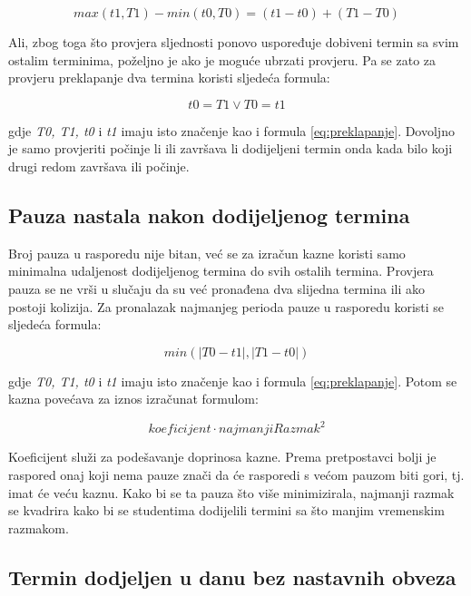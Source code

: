 \documentclass[times, utf8, zavrsni]{fer}
\begin{document}
\begin{equation}
max(t1, T1) - min(t0, T0) = (t1 - t0) + (T1  - T0)
\label{eq:slijednost-long}
\end{equation}

Ali, zbog toga što provjera sljednosti ponovo uspoređuje dobiveni termin sa svim ostalim terminima, poželjno je ako je moguće ubrzati provjeru. Pa se zato za provjeru preklapanje dva termina koristi sljedeća formula:

\begin{equation}
t0 = T1 \lor T0 = t1
\label{eq:slijednost-short}
\end{equation}

gdje \emph{T0, T1, t0} i \emph{t1} imaju isto značenje kao i formula \ref{eq:preklapanje}. Dovoljno je samo provjeriti počinje li ili završava li dodijeljeni termin onda kada bilo koji drugi redom završava ili počinje.

\subsection{Pauza nastala nakon dodijeljenog termina}

Broj pauza u rasporedu nije bitan, već se za izračun kazne koristi samo minimalna udaljenost dodijeljenog termina do svih ostalih termina. Provjera pauza se ne vrši u slučaju da su već pronađena dva slijedna termina ili ako postoji kolizija. Za pronalazak najmanjeg perioda pauze u rasporedu koristi se sljedeća formula:

\begin{equation}
min(|T0 - t1|, |T1 - t0|)
\label{eq:min-rupa}
\end{equation}

gdje \emph{T0, T1, t0} i \emph{t1} imaju isto značenje kao i formula \ref{eq:preklapanje}. Potom se kazna povećava za iznos izračunat formulom:

\begin{equation}
koeficijent \cdot najmanjiRazmak^2
\label{eq:min-rupa-kazna}
\end{equation}

Koeficijent služi za podešavanje doprinosa kazne. Prema pretpostavci bolji je raspored onaj koji nema pauze znači da će rasporedi s većom pauzom biti gori, tj. imat će veću kaznu. Kako bi se ta pauza što više minimizirala, najmanji razmak se kvadrira kako bi se studentima dodijelili termini sa što manjim vremenskim razmakom.

\subsection{Termin dodjeljen u danu bez nastavnih obveza}
\end{document}
